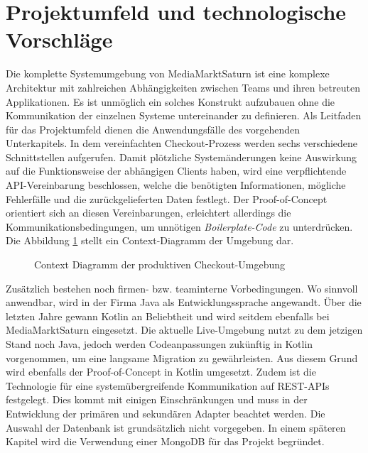 \pagebreak

\section{Projektumfeld und technologische Vorschläge}

Die komplette Systemumgebung von MediaMarktSaturn ist eine komplexe Architektur mit zahlreichen Abhängigkeiten zwischen Teams und ihren betreuten Applikationen. Es ist unmöglich ein solches Konstrukt aufzubauen ohne die Kommunikation der einzelnen Systeme untereinander zu definieren. Als Leitfaden für das Projektumfeld dienen die Anwendungsfälle des vorgehenden Unterkapitels. In dem vereinfachten Checkout-Prozess werden sechs verschiedene Schnittstellen aufgerufen. Damit plötzliche Systemänderungen keine Auswirkung auf die Funktionsweise der abhängigen Clients haben, wird eine verpflichtende API-Vereinbarung beschlossen, welche die benötigten Informationen, mögliche Fehlerfälle und die zurückgelieferten Daten festlegt. Der Proof-of-Concept orientiert sich an diesen Vereinbarungen, erleichtert allerdings die Kommunikationsbedingungen, um unnötigen \emph{\Gls{Boilerplate-Code}} zu unterdrücken. Die Abbildung \ref{fig:ContextDiagramm} stellt ein Context-Diagramm der Umgebung dar. 

\begin{figure}[htbp]
	\vspace{0.5cm}
	\centering
	
	\caption{Context Diagramm der produktiven Checkout-Umgebung}
	\label{fig:ContextDiagramm}
	\vspace{0.5cm}
\end{figure}

Zusätzlich bestehen noch firmen- bzw. teaminterne Vorbedingungen. Wo sinnvoll anwendbar, wird in der Firma Java als Entwicklungssprache angewandt. Über die letzten Jahre gewann Kotlin an Beliebtheit und wird seitdem ebenfalls bei MediaMarktSaturn eingesetzt. Die aktuelle Live-Umgebung nutzt zu dem jetzigen Stand noch Java, jedoch werden Codeanpassungen zukünftig in Kotlin vorgenommen, um eine langsame Migration zu gewährleisten. Aus diesem Grund wird ebenfalls der Proof-of-Concept in Kotlin umgesetzt. Zudem ist die Technologie für eine systemübergreifende Kommunikation auf REST-APIs festgelegt. Dies kommt mit einigen Einschränkungen und muss in der Entwicklung der primären und sekundären Adapter beachtet werden. Die Auswahl der Datenbank ist grundsätzlich nicht vorgegeben. In einem späteren Kapitel wird die Verwendung einer MongoDB für das Projekt begründet.
